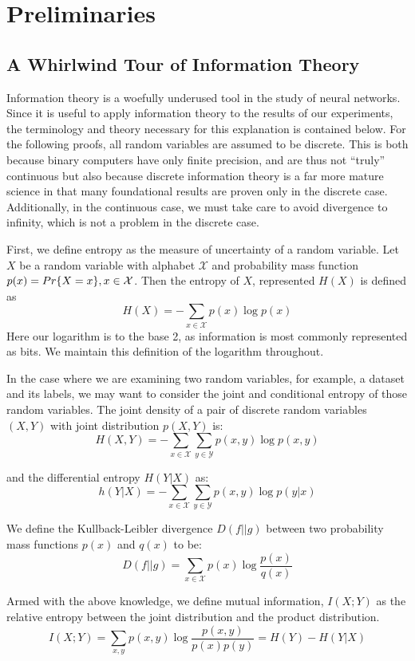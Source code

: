 \chapter{Preliminaries}
\label{chap:two}

\section{A Whirlwind Tour of Information Theory}
Information theory is a woefully underused tool in the study of neural networks. 
Since it is useful to apply information theory to the results of our experiments, the terminology and theory necessary for this explanation is contained below.
For the following proofs, all random variables are assumed to be discrete. 
This is both because binary computers have only finite precision, and are thus not ``truly'' continuous but also because discrete information theory is a far more mature science in that many foundational results are proven only in the discrete case.
Additionally, in the continuous case, we must take care to avoid divergence to infinity, which is not a problem in the discrete case.

First, we define entropy as the measure of uncertainty of a random variable.
Let $X$ be a random variable with alphabet $\mathcal{X}$ and probability mass function $p(x) = \\Pr\{X = x\}, x \in \mathcal{X}$.
Then the entropy of $X$, represented $H(X)$ is defined as
$$H(X) = -\sum_{x \in \mathcal{X}} p(x) \log{p(x)}$$
Here our logarithm is to the base 2, as information is most commonly represented as bits.
We maintain this definition of the logarithm throughout. 

In the case where we are examining two random variables, for example, a dataset and its labels, we may want to consider the joint and conditional entropy of those random variables.
The joint density of a pair of discrete random variables $(X, Y)$ with joint distribution $p(X, Y)$ is:
$$H(X, Y) = - \sum_{x \in \mathcal{X}} \sum_{y \in \mathcal{Y}} p(x, y) \log{p(x, y)}$$

and the differential entropy $H(Y | X)$ as:
$$ h(Y|X) = -\sum_{x \in \mathcal{X}} \sum_{y \in \mathcal{Y}} p(x, y) \log{p(y|x)}$$

We define the Kullback-Leibler divergence $D(f||g)$ between two probability mass functions $p(x)$ and $q(x)$ to be:
$$D(f||g) = \sum_{x \in \mathcal{X}} p(x) \log{\frac{p(x)}{q(x)}}$$

Armed with the above knowledge, we define mutual information, $I(X; Y)$ as the relative entropy between the joint distribution and the product distribution.
$$I(X; Y) = \sum_{x, y} p(x, y) \log{\frac{p(x,y)}{p(x) p(y)}} = H(Y) - H(Y|X)$$

